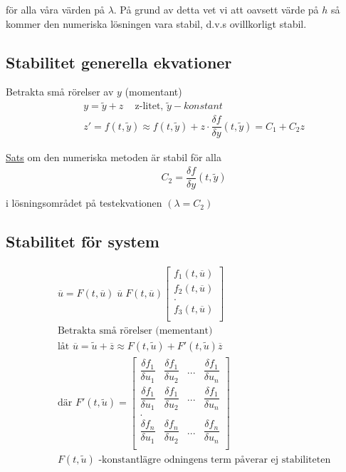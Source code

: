 för alla våra värden på $\lambda$. På grund av detta vet vi att oavsett värde på $h$ så kommer den numeriska lösningen vara stabil, d.v.s ovillkorligt stabil.


\newpage
\subsection{Stabilitet generella ekvationer}
Betrakta små rörelser av $y$ (momentant)
\begin{align*}
  &\quad  y=\tilde{y}+z \;\;\; \text{  z-litet, $\tilde{y}-konstant$} \\
  &\quad  z'=f(t,\tilde{y}) \approx f(t,\tilde{y})+z\cdot\dfrac{\delta f}{\delta y}(t,\tilde{y}) = C_1+C_2z
\end{align*}

\underline{Sats} om den numeriska metoden är stabil för alla 
\begin{align*}
  &\quad  C_2=\dfrac{\delta f}{\delta y}(t,\tilde{y}) \\
\end{align*}
i lösningsområdet på testekvationen $(\lambda=C_2)$

\subsection{Stabilitet för system}
\begin{align*}
  &\quad  \overline{u} = F(t,\overline{u}) \; \overline{u} \; F(t,\overline{u})
  \begin{bmatrix}
    f_1(t,\overline{u})\\
    f_2(t,\overline{u})\\
    .\\
    f_3(t,\overline{u})\\
  \end{bmatrix}\\
  &\quad  \text{Betrakta små rörelser (mementant)} \\
  &\quad  \text{låt } \overline{u}=\tilde{u}+\overline{z} \approx F(t,\tilde{u})+F'(t,\tilde{u})\overline{z} \\
  &\quad  \text{där } F'(t,\tilde{u})=
  \begin{bmatrix}
    \dfrac{\delta f_1}{\delta u_1} & \dfrac{\delta f_1}{\delta u_2} & ... & \dfrac{\delta f_1}{\delta u_n} \\
    \dfrac{\delta f_1}{\delta u_1} & \dfrac{\delta f_1}{\delta u_2} & ... & \dfrac{\delta f_1}{\delta u_n} \\
    . & & & \\
    \dfrac{\delta f_n}{\delta u_1} & \dfrac{\delta f_n}{\delta u_2} & ... & \dfrac{\delta f_n}{\delta u_n} \\
  \end{bmatrix}\\
  &\quad F(t,\tilde{u}) \text{ -konstantlägre odningens term påverar ej stabiliteten}\\
\end{align*}

